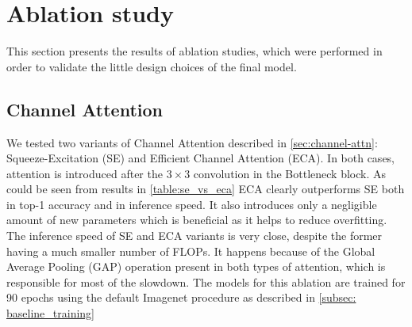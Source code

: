 \section{Ablation study} \label{sec:ablation}

This section presents the results of ablation studies, which were performed in order to validate the little design choices of the final model. 

\subsection{Channel Attention}
We tested two variants of Channel Attention described in \autoref{sec:channel-attn}: Squeeze-Excitation (SE) and Efficient Channel Attention (ECA). In both cases, attention is introduced after the $3 \times 3$ convolution in the Bottleneck block. As could be seen from results in \autoref{table:se_vs_eca} ECA clearly outperforms SE both in top-1 accuracy and in inference speed. It also introduces only a negligible amount of new parameters which is beneficial as it helps to reduce overfitting. The inference speed of SE and ECA variants is very close, despite the former having a much smaller number of FLOPs. It happens because of the Global Average Pooling (GAP) operation present in both types of attention, which is responsible for most of the slowdown. The models for this ablation are trained for 90 epochs using the default Imagenet procedure as described in \autoref{subsec: baseline_training}





